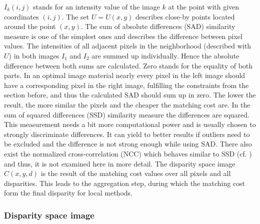 \noindent $I_k(i,j)$ stands for an intensity value of the image $k$ at the point with given coordinates $(i,j)$.
The set $U = U(x,y)$ describes close-by points located around the point $(x,y)$.
The sum of absolute differences (SAD) similarity measure is one of the simplest ones and describes the difference between pixel values.
The intensities of all adjacent pixels in the neighborhood (described with $U$) in both images $I_1$ and $I_2$ are summed up individually.
Hence the absolute difference between both sums are calculated.
Zero stands for the equality of both parts.
In an optimal image material nearly every pixel in the left image should have a corresponding pixel in the right image, fulfilling the constraints from the section before, and thus the calculated SAD should sum up in zero.
The lower the result, the more similar the pixels and the cheaper the matching cost are.
\newline\newline\noindent In the sum of squared differences (SSD) similarity measure the differences are squared.
This measurement needs a bit more computational power and is usually chosen to strongly discriminate differences.
It can yield to better results if outliers need to be excluded and the difference is not strong enough while using SAD.
There also exist the normalized cross-correlation (NCC) which behaves similar to SSD (cf. \citep{hirschmuller2007evaluation, scharstein2002taxonomy, cyganek2011introduction}) and thus, it is not examined here in more detail.
\newline\newline\noindent The disparity space image $C(x,y,d)$ is the result of the matching cost values over all pixels and all disparities.
This leads to the aggregation step, during which the matching cost form the final disparity for local methods.

\newpage
\subsubsection{Disparity space image}

